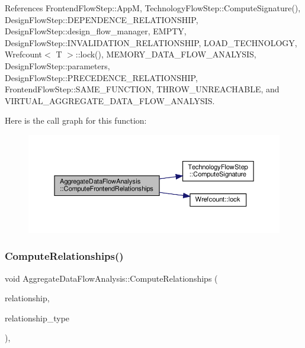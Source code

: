References Frontend\+Flow\+Step\+::\+AppM, Technology\+Flow\+Step\+::\+Compute\+Signature(), Design\+Flow\+Step\+::\+D\+E\+P\+E\+N\+D\+E\+N\+C\+E\+\_\+\+R\+E\+L\+A\+T\+I\+O\+N\+S\+H\+IP, Design\+Flow\+Step\+::design\+\_\+flow\+\_\+manager, E\+M\+P\+TY, Design\+Flow\+Step\+::\+I\+N\+V\+A\+L\+I\+D\+A\+T\+I\+O\+N\+\_\+\+R\+E\+L\+A\+T\+I\+O\+N\+S\+H\+IP, L\+O\+A\+D\+\_\+\+T\+E\+C\+H\+N\+O\+L\+O\+GY, Wrefcount$<$ T $>$\+::lock(), M\+E\+M\+O\+R\+Y\+\_\+\+D\+A\+T\+A\+\_\+\+F\+L\+O\+W\+\_\+\+A\+N\+A\+L\+Y\+S\+IS, Design\+Flow\+Step\+::parameters, Design\+Flow\+Step\+::\+P\+R\+E\+C\+E\+D\+E\+N\+C\+E\+\_\+\+R\+E\+L\+A\+T\+I\+O\+N\+S\+H\+IP, Frontend\+Flow\+Step\+::\+S\+A\+M\+E\+\_\+\+F\+U\+N\+C\+T\+I\+ON, T\+H\+R\+O\+W\+\_\+\+U\+N\+R\+E\+A\+C\+H\+A\+B\+LE, and V\+I\+R\+T\+U\+A\+L\+\_\+\+A\+G\+G\+R\+E\+G\+A\+T\+E\+\_\+\+D\+A\+T\+A\+\_\+\+F\+L\+O\+W\+\_\+\+A\+N\+A\+L\+Y\+S\+IS.

Here is the call graph for this function\+:
\nopagebreak
\begin{figure}[H]
\begin{center}
\leavevmode
\includegraphics[width=350pt]{da/d29/classAggregateDataFlowAnalysis_a7d4599f7adabe9d4af16055fc5ad1cdb_cgraph}
\end{center}
\end{figure}
\mbox{\label{classAggregateDataFlowAnalysis_aa387e9bcfac9ad1ac7bab7b5b94f19fd}} 
\subsubsection{\texorpdfstring{Compute\+Relationships()}{ComputeRelationships()}}
{\footnotesize\ttfamily void Aggregate\+Data\+Flow\+Analysis\+::\+Compute\+Relationships (\begin{DoxyParamCaption}\item[{\hyperlink{classDesignFlowStepSet}{Design\+Flow\+Step\+Set} \&}]{relationship,  }\item[{const \hyperlink{classDesignFlowStep_a723a3baf19ff2ceb77bc13e099d0b1b7}{Design\+Flow\+Step\+::\+Relationship\+Type}}]{relationship\+\_\+type }\end{DoxyParamCaption})\hspace{0.3cm}{\ttfamily [override]}, {\ttfamily [virtual]}}



